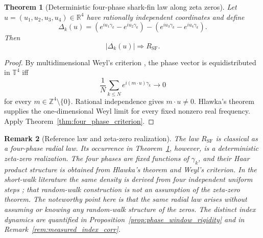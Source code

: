 \documentclass[pdflatex,sn-mathphys-num]{sn-jnl}
\numberwithin{equation}{section}
\theoremstyle{thmstyleone}
\newtheorem{theorem}{Theorem}[section]
\theoremstyle{thmstylethree}
\theoremstyle{thmstyletwo}
\newtheorem{remark}[theorem]{Remark}
\newcommand{\R}{\mathbb R}
\newcommand{\Z}{\mathbb Z}
\newcommand{\Torus}{\mathbb T}
\newcommand{\RSF}{R_{\mathrm{SF}}}
\newcommand{\1}{\mathbf 1}
\begin{document}
\begin{theorem}[Deterministic four-phase shark-fin law along zeta zeros]
\label{thm:hlawka_shark}
Let $u=(u_1,u_2,u_3,u_4)\in\R^4$ have rationally independent coordinates and define
\[
 \Delta_k(u)=
 (e^{iu_1\gamma_k}-e^{iu_2\gamma_k})
 -(e^{iu_3\gamma_k}-e^{iu_4\gamma_k}).
\]
Then
\[
 |\Delta_k(u)|\Longrightarrow\RSF.
\]
\end{theorem}

\begin{proof}
By multidimensional Weyl's criterion \cite{Weyl1916}, the phase vector is equidistributed in $\Torus^4$ iff
\[
 \frac1N\sum_{k\le N}e^{i(m\cdot u)\gamma_k}\to0
\]
for every $m\in\Z^4\setminus\{0\}$.  Rational independence gives $m\cdot u\ne0$.  Hlawka's theorem \cite{Hlawka1975} supplies the one-dimensional Weyl limit for every fixed nonzero real frequency.  Apply Theorem~\ref{thm:four_phase_criterion}.
\end{proof}

\begin{remark}[Reference law and zeta-zero realization]
The law \(\RSF\) is classical as a four-phase radial law.  Its occurrence in
Theorem~\ref{thm:hlawka_shark}, however, is a deterministic zeta-zero
realization.  The four phases are fixed functions of \(\gamma_k\), and their
Haar product structure is obtained from Hlawka's theorem and Weyl's criterion.
In the short-walk literature the same density is derived from four independent
uniform steps \cite{BorweinEtAl2012,BorweinStraubWan2013,McCrorie2021}; that random-walk construction is not an assumption of the
zeta-zero theorem.  The noteworthy point here is that the same radial law
arises without assuming or knowing any random-walk structure of the zeros.  The distinct index dynamics are quantified in Proposition~\ref{prop:phase_window_rigidity} and in Remark~\ref{rem:measured_index_corr}.
\end{remark}
\end{document}
